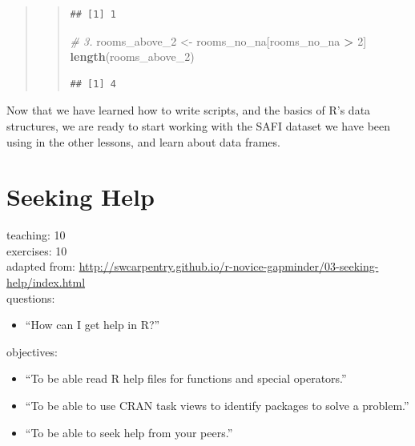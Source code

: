 \documentclass[]{book}
\newenvironment{Shaded}{\begin{snugshade}}{\end{snugshade}}
\newcommand{\KeywordTok}[1]{\textcolor[rgb]{0.13,0.29,0.53}{\textbf{#1}}}
\newcommand{\DecValTok}[1]{\textcolor[rgb]{0.00,0.00,0.81}{#1}}
\newcommand{\StringTok}[1]{\textcolor[rgb]{0.31,0.60,0.02}{#1}}
\newcommand{\CommentTok}[1]{\textcolor[rgb]{0.56,0.35,0.01}{\textit{#1}}}
\newcommand{\OperatorTok}[1]{\textcolor[rgb]{0.81,0.36,0.00}{\textbf{#1}}}
\newcommand{\NormalTok}[1]{#1}
\providecommand{\tightlist}{%
  \setlength{\itemsep}{0pt}\setlength{\parskip}{0pt}}
\begin{document}
\begin{quote}
\begin{quote}
\begin{verbatim}
## [1] 1
\end{verbatim}

\begin{Shaded}
\begin{Highlighting}[]
\CommentTok{# 3.}
\NormalTok{rooms_above_}\DecValTok{2}\NormalTok{ <-}\StringTok{ }\NormalTok{rooms_no_na[rooms_no_na }\OperatorTok{>}\StringTok{ }\DecValTok{2}\NormalTok{]}
\KeywordTok{length}\NormalTok{(rooms_above_}\DecValTok{2}\NormalTok{)}
\end{Highlighting}
\end{Shaded}

\begin{verbatim}
## [1] 4
\end{verbatim}
\end{quote}
\end{quote}

Now that we have learned how to write scripts, and the basics of R's
data structures, we are ready to start working with the SAFI dataset we
have been using in the other lessons, and learn about data frames.

\chapter{Seeking Help}\label{help}

teaching: 10\\
exercises: 10\\
adapted from:
\url{http://swcarpentry.github.io/r-novice-gapminder/03-seeking-help/index.html}\\
questions:

\begin{itemize}
\tightlist
\item
  ``How can I get help in R?''
\end{itemize}

objectives:

\begin{itemize}
\tightlist
\item
  ``To be able read R help files for functions and special
  operators.''\\
\item
  ``To be able to use CRAN task views to identify packages to solve a
  problem.''\\
\item
  ``To be able to seek help from your peers.''
\end{itemize}
\end{document}

